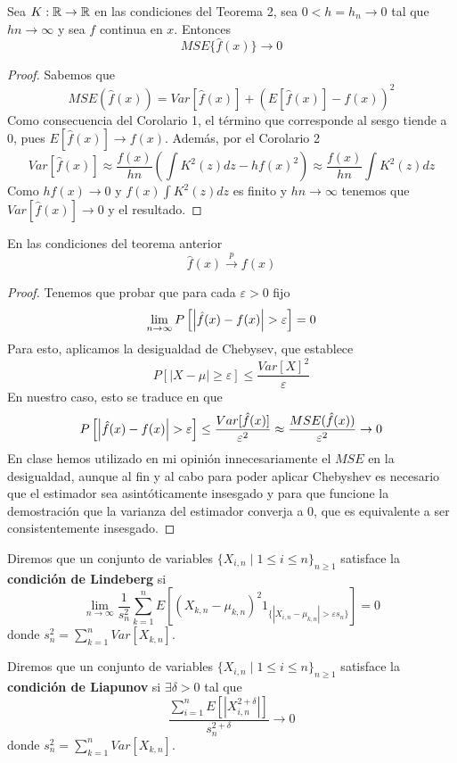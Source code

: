\documentclass[MyPE.tex]{subfiles}
\begin{document}
\newpage
\begin{theorem}
Sea $K:\mathbb{R}\to\mathbb{R}$ en las condiciones del Teorema 2, sea $0<h = h_n \to 0$ tal que $hn \to \infty$ y sea ${f}$ continua en $x$. Entonces 
$$
MSE\{\hat{f}(x)\}\to 0
$$
\end{theorem}
\begin{proof}
Sabemos que
$$
MSE(\hat{f}(x)) = Var[\hat{f}(x)] + \left(E[\hat{f}(x)]-f(x)\right)^2
$$
Como consecuencia del Corolario 1, el término que corresponde al sesgo tiende a $0$, pues $E[\hat{f}(x)]\to f(x)$. Además, por el  Corolario 2
$$
Var[\hat{f}(x)] \approx \frac{f(x)}{hn}\left(\int K^2(z)dz - hf(x)^2\right)  \approx \frac{f(x)}{hn}\int K^2(z)dz 
$$
Como $hf(x) \to 0$ y $f(x)\int K^2(z)dz$ es finito y $hn\to \infty$ tenemos que $Var[\hat{f}(x)] \to 0$ y el resultado. 
\end{proof}
\begin{coro}
En las condiciones del teorema anterior
$$
\hat{f}(x)\overset{p}{\longrightarrow}f(x)
$$
\end{coro}
\begin{proof}
Tenemos que probar que para cada $\varepsilon>0$ fijo
$$
\lim_{n\to\infty}P\left[\left\lvert\hat{f}(x)-f(x)\right\rvert>\varepsilon\right]=0
$$
Para esto, aplicamos la desigualdad de Chebysev, que establece
$$
P[|X-\mu|\geq \varepsilon ]\leq \frac{Var[X]^2}{\varepsilon}
$$
En nuestro caso, esto se traduce en que
$$
P\left[\left\lvert\hat{f}(x)-f(x)\right\rvert>\varepsilon\right] \leq \frac{Var[\hat{f}(x)]}{\varepsilon^2} \approx \frac{MSE(\hat{f}(x))}{\varepsilon^2} \to 0 
$$
En clase hemos utilizado en mi opinión innecesariamente el $MSE$ en la desigualdad, aunque al fin y al cabo para poder aplicar Chebyshev es necesario que el estimador sea asintóticamente insesgado y para que funcione la demostración que la varianza del estimador converja a $0$, que es equivalente a ser consistentemente insesgado.
\end{proof}
\begin{defi}
Diremos que un conjunto de variables $\{X_{i,n} \mid 1\leq i \leq n\}_{n\geq 1}$ satisface la \textbf{condición de Lindeberg} si
$$
\lim_{n\to \infty} \frac{1}{s_n^2}\sum_{k=1}^n E[(X_{k,n}-\mu_{k,n})^2 1_{\{|X_{i,n}-\mu_{k,n}|>\varepsilon s_n\}}]=0
$$
donde $s_n^2 = \sum_{k=1}^n Var[X_{k,n}]$.
\end{defi}
\newpage
\begin{defi}
Diremos que un conjunto de variables $\{X_{i,n} \mid 1\leq i \leq n\}_{n\geq 1}$ satisface la \textbf{condición de Liapunov} si $\exists \delta >0$  tal que
$$
\frac{\sum_{i=1}^n E[|X_{i,n}^{2+\delta}|]}{s_n^{2+\delta}} \to 0
$$
donde $s_n^2 = \sum_{k=1}^n Var[X_{k,n}]$.
\end{defi}
\end{document}
